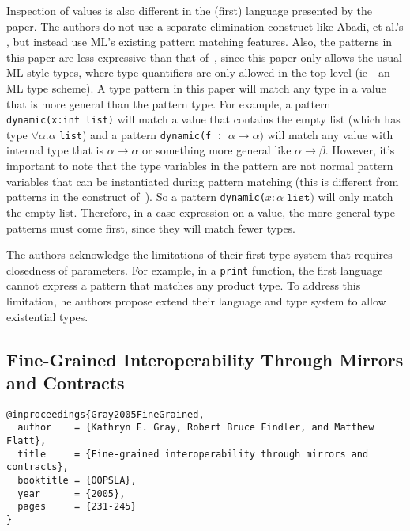 \documentclass[12pt]{article}	%
\begin{document}
Inspection of \Dynamic values is also different in the (first) language presented by the paper. The authors do not use a separate elimination construct like Abadi, et al.'s \typecase, but instead use ML's existing pattern matching features.  Also, the patterns in this paper are less expressive than that of~\cite{Abadi1995DynamicPolymorphic}, since this paper only allows the usual ML-style types, where type quantifiers are only allowed in the top level (ie - an ML type scheme). A type pattern in this paper will match any type in a \Dynamic value that is more general than the pattern type. For example, a pattern \verb!dynamic(x:int list)! will match a \Dynamic value that contains the empty list (which has type $\forall \alpha.\alpha$ \verb!list!) and a pattern \verb!dynamic(f : !$\alpha \rightarrow \alpha)$ will match any \Dynamic value with internal type that is $\alpha \rightarrow \alpha$ or something more general like $\alpha \rightarrow \beta$. However, it's important to note that the type variables in the pattern are not normal pattern variables that can be instantiated during pattern matching (this is different from patterns in the \typecase construct of~\cite{Abadi1995DynamicPolymorphic}). So a pattern \verb!dynamic(!$x:\alpha \; \mathtt{list})$ will only match the empty list. Therefore, in a case expression on a \Dynamic value, the more general type patterns must come first, since they will match fewer types.

The authors acknowledge the limitations of their first type system that requires closedness of \dynamic parameters. For example, in a \texttt{print} function, the first language cannot express a pattern that matches any product type. To address this limitation, he authors propose extend their language and type system to allow existential types.




\subsection*{Fine-Grained Interoperability Through Mirrors and Contracts~\cite{Gray2005FineGrained}}

\begin{verbatim}
@inproceedings{Gray2005FineGrained,
  author    = {Kathryn E. Gray, Robert Bruce Findler, and Matthew Flatt},
  title     = {Fine-grained interoperability through mirrors and contracts},
  booktitle = {OOPSLA},
  year      = {2005},
  pages     = {231-245}
}
\end{verbatim}
\end{document}
